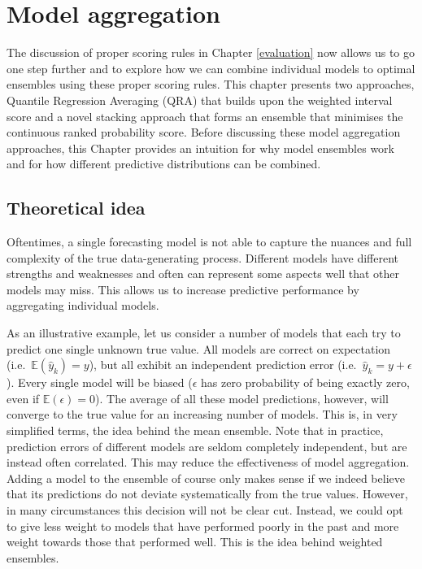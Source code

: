 \documentclass[
]{book}
\begin{document}
\hypertarget{model-aggregation}{%
\chapter{Model aggregation}\label{model-aggregation}}

The discussion of proper scoring rules in Chapter \ref{evaluation} now allows us to go one step further and to explore how we can combine individual models to optimal ensembles using these proper scoring rules. This chapter presents two approaches, Quantile Regression Averaging (QRA) that builds upon the weighted interval score and a novel stacking approach that forms an ensemble that minimises the continuous ranked probability score. Before discussing these model aggregation approaches, this Chapter provides an intuition for why model ensembles work and for how different predictive distributions can be combined.

\hypertarget{theoretical-idea}{%
\section{Theoretical idea}\label{theoretical-idea}}

Oftentimes, a single forecasting model is not able to capture the nuances and full complexity of the true data-generating process. Different models have different strengths and weaknesses and often can represent some aspects well that other models may miss. This allows us to increase predictive performance by aggregating individual models.

As an illustrative example, let us consider a number of models that each try to predict one single unknown true value. All models are correct on expectation (i.e.~\(\mathbb{E}(\hat{y}_k) = y\)), but all exhibit an independent prediction error (i.e.~\(\hat{y}_k = y + \epsilon\)). Every single model will be biased (\(\epsilon\) has zero probability of being exactly zero, even if \(\mathbb{E}(\epsilon) = 0\)). The average of all these model predictions, however, will converge to the true value for an increasing number of models. This is, in very simplified terms, the idea behind the mean ensemble. Note that in practice, prediction errors of different models are seldom completely independent, but are instead often correlated. This may reduce the effectiveness of model aggregation. Adding a model to the ensemble of course only makes sense if we indeed believe that its predictions do not deviate systematically from the true values. However, in many circumstances this decision will not be clear cut. Instead, we could opt to give less weight to models that have performed poorly in the past and more weight towards those that performed well. This is the idea behind weighted ensembles.
\end{document}
